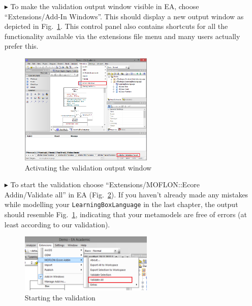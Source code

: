 \begin{enumerate}
\item[$\blacktriangleright$] To make the validation output window visible in EA, choose ``Extensions/\-Add-In Windows''.
This should display a new output window as depicted in Fig.~\ref{fig:validation_output}. This control panel also contains shortcuts for all the functionality available via the extensions file menu and many users actually prefer this.

\begin{figure}[htbp]
	\centering
  \includegraphics[width=0.6\textwidth]{pics/memBoxBilder/memBox40}
	\caption{Activating the validation output window}
	\label{fig:validation_output}
\end{figure}
\FloatBarrier

\item[$\blacktriangleright$] To start the validation choose ``Extensions/\-MOFLON::Ecore Addin/\-Validate all'' in EA (Fig.~\ref{fig:validation_menu}).
If you haven't already made any mistakes while modelling your \texttt{LearningBoxLanguage} in the last chapter, the output should resemble Fig.~\ref{fig:validation_output}, indicating that your metamodels are free of errors (at least according to our validation).

\begin{figure}[htbp]
	\centering
  \includegraphics[width=0.6\textwidth]{pics/memBoxBilder/memBox41}
	\caption{Starting the validation}
	\label{fig:validation_menu}
\end{figure}
\FloatBarrier
\end{enumerate}


